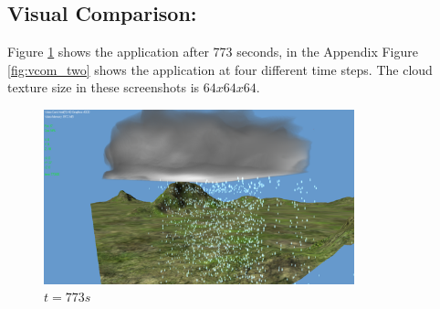 \subsection{Visual Comparison:}
\label{sec:visual_results}

Figure \ref{fig:vcom} shows the application after 773 seconds, in the Appendix Figure \ref{fig:vcom_two} shows the application at four different time steps. The cloud texture size in these screenshots is $64x64x64$. 

\begin{figure}[ht!]
	\centering
	\includegraphics[width=90mm]{images/visualcomparrison.png}
	\caption{$t = 773s$}
	\label{fig:vcom}
\end{figure}